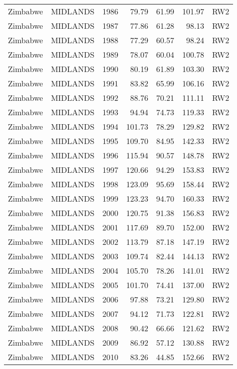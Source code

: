 \begin{longtable}{lllrrrl}
  Zimbabwe & MIDLANDS & 1986 & 79.79 & 61.99 & 101.97 & RW2 \\ 
  Zimbabwe & MIDLANDS & 1987 & 77.86 & 61.28 & 98.13 & RW2 \\ 
  Zimbabwe & MIDLANDS & 1988 & 77.29 & 60.57 & 98.24 & RW2 \\ 
  Zimbabwe & MIDLANDS & 1989 & 78.07 & 60.04 & 100.78 & RW2 \\ 
  Zimbabwe & MIDLANDS & 1990 & 80.19 & 61.89 & 103.30 & RW2 \\ 
  Zimbabwe & MIDLANDS & 1991 & 83.82 & 65.99 & 106.16 & RW2 \\ 
  Zimbabwe & MIDLANDS & 1992 & 88.76 & 70.21 & 111.11 & RW2 \\ 
  Zimbabwe & MIDLANDS & 1993 & 94.94 & 74.73 & 119.33 & RW2 \\ 
  Zimbabwe & MIDLANDS & 1994 & 101.73 & 78.29 & 129.82 & RW2 \\ 
  Zimbabwe & MIDLANDS & 1995 & 109.70 & 84.95 & 142.33 & RW2 \\ 
  Zimbabwe & MIDLANDS & 1996 & 115.94 & 90.57 & 148.78 & RW2 \\ 
  Zimbabwe & MIDLANDS & 1997 & 120.66 & 94.29 & 153.83 & RW2 \\ 
  Zimbabwe & MIDLANDS & 1998 & 123.09 & 95.69 & 158.44 & RW2 \\ 
  Zimbabwe & MIDLANDS & 1999 & 123.23 & 94.70 & 160.33 & RW2 \\ 
  Zimbabwe & MIDLANDS & 2000 & 120.75 & 91.38 & 156.83 & RW2 \\ 
  Zimbabwe & MIDLANDS & 2001 & 117.69 & 89.70 & 152.00 & RW2 \\ 
  Zimbabwe & MIDLANDS & 2002 & 113.79 & 87.18 & 147.19 & RW2 \\ 
  Zimbabwe & MIDLANDS & 2003 & 109.74 & 82.44 & 144.13 & RW2 \\ 
  Zimbabwe & MIDLANDS & 2004 & 105.70 & 78.26 & 141.01 & RW2 \\ 
  Zimbabwe & MIDLANDS & 2005 & 101.70 & 74.41 & 137.00 & RW2 \\ 
  Zimbabwe & MIDLANDS & 2006 & 97.88 & 73.21 & 129.80 & RW2 \\ 
  Zimbabwe & MIDLANDS & 2007 & 94.12 & 71.73 & 122.81 & RW2 \\ 
  Zimbabwe & MIDLANDS & 2008 & 90.42 & 66.66 & 121.62 & RW2 \\ 
  Zimbabwe & MIDLANDS & 2009 & 86.92 & 57.12 & 130.88 & RW2 \\ 
  Zimbabwe & MIDLANDS & 2010 & 83.26 & 44.85 & 152.66 & RW2 \\ 

\end{longtable}

